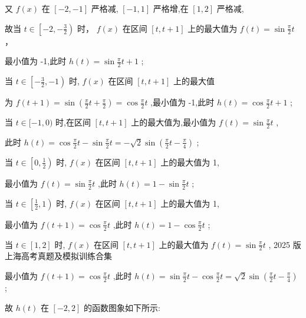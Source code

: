 \documentclass[10pt]{article}
\begin{document}
又 \(f\left( x\right)\) 在 \(\left\lbrack  {-2, - 1}\right\rbrack\) 严格减, \(\left\lbrack  {-1,1}\right\rbrack\) 严格增,在 \(\left\lbrack  {1,2}\right\rbrack\) 严格减,

故当 \(t \in  \left\lbrack  {-2, - \frac{3}{2}}\right)\) 时， \(f\left( x\right)\) 在区间 \(\left\lbrack  {t,t + 1}\right\rbrack\) 上的最大值为 \(f\left( t\right)  = \sin \frac{\pi }{2}t\) ，

最小值为 -1,此时 \(h\left( t\right)  = \sin \frac{\pi }{2}t + 1\) ;

当 \(t \in  \left\lbrack  {-\frac{3}{2}, - 1}\right)\) 时, \(f\left( x\right)\) 在区间 \(\left\lbrack  {t,t + 1}\right\rbrack\) 上的最大值

为 \(f\left( {t + 1}\right)  = \sin \left( {\frac{\pi }{2}t + \frac{\pi }{2}}\right)  = \cos \frac{\pi }{2}t\) ,最小值为 -1,此时 \(h\left( t\right)  = \cos \frac{\pi }{2}t + 1\) ;

当 \(t \in  \lbrack  - 1,0)\) 时,在区间 \(\left\lbrack  {t,t + 1}\right\rbrack\) 上的最大值为,最小值为 \(f\left( t\right)  = \sin \frac{\pi }{2}t\) ,

此时 \(h\left( t\right)  = \cos \frac{\pi }{2}t - \sin \frac{\pi }{2}t =  - \sqrt{2}\sin \left( {\frac{\pi }{2}t - \frac{\pi }{4}}\right)\) ;

当 \(t \in  \left\lbrack  {0,\frac{1}{2}}\right)\) 时, \(f\left( x\right)\) 在区间 \(\left\lbrack  {t,t + 1}\right\rbrack\) 上的最大值为 1,

最小值为 \(f\left( t\right)  = \sin \frac{\pi }{2}t\) ,此时 \(h\left( t\right)  = 1 - \sin \frac{\pi }{2}t\) ;

当 \(t \in  \left\lbrack  {\frac{1}{2},1}\right)\) 时, \(f\left( x\right)\) 在区间 \(\left\lbrack  {t,t + 1}\right\rbrack\) 上的最大值为 1,

最小值为 \(f\left( {t + 1}\right)  = \cos \frac{\pi }{2}t\) ,此时 \(h\left( t\right)  = 1 - \cos \frac{\pi }{2}t\) ;

当 \(t \in  \left\lbrack  {1,2}\right\rbrack\) 时, \(f\left( x\right)\) 在区间 \(\left\lbrack  {t,t + 1}\right\rbrack\) 上的最大值为 \(f\left( t\right)  = \sin \frac{\pi }{2}t\) , 2025 版上海高考真题及模拟训练合集

最小值为 \(f\left( {t + 1}\right)  = \cos \frac{\pi }{2}t\) ,此时 \(h\left( t\right)  = \sin \frac{\pi }{2}t - \cos \frac{\pi }{2}t = \sqrt{2}\sin \left( {\frac{\pi }{2}t - \frac{\pi }{4}}\right)\) ;

故 \(h\left( t\right)\) 在 \(\left\lbrack  {-2,2}\right\rbrack\) 的函数图象如下所示:
\end{document}
